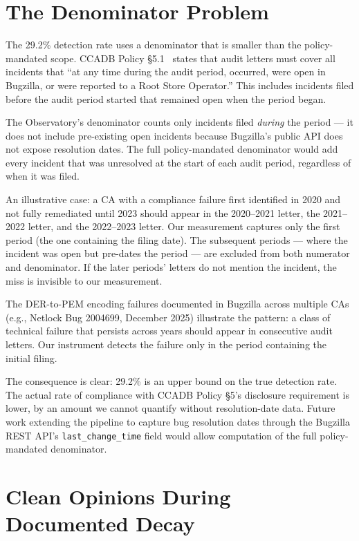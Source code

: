 \documentclass[10pt,twocolumn,letterpaper]{article}
\begin{document}
\section{The Denominator Problem}
\label{sec:denominator}

The 29.2\% detection rate uses a denominator that is smaller than the
policy-mandated scope. CCADB Policy \S5.1~\cite{ccadb-policy} states
that audit letters must cover all incidents that ``at any time during
the audit period, occurred, were open in Bugzilla, or were reported
to a Root Store Operator.'' This includes incidents filed before the
audit period started that remained open when the period began.

The Observatory's denominator counts only incidents filed \textit{during}
the period --- it does not include pre-existing open incidents because
Bugzilla's public API does not expose resolution dates. The full
policy-mandated denominator would add every incident that was
unresolved at the start of each audit period, regardless of when it
was filed.

An illustrative case: a CA with a compliance failure first identified
in 2020 and not fully remediated until 2023 should appear in the
2020--2021 letter, the 2021--2022 letter, and the 2022--2023 letter.
Our measurement captures only the first period (the one containing
the filing date). The subsequent periods --- where the incident was
open but pre-dates the period --- are excluded from both numerator
and denominator. If the later periods' letters do not mention the
incident, the miss is invisible to our measurement.

The DER-to-PEM encoding failures documented in Bugzilla across
multiple CAs (e.g., Netlock Bug 2004699, December 2025) illustrate
the pattern: a class of technical failure that persists across years
should appear in consecutive audit letters. Our instrument detects
the failure only in the period containing the initial filing.

The consequence is clear: 29.2\% is an upper bound on the true
detection rate. The actual rate of compliance with CCADB Policy \S5's
disclosure requirement is lower, by an amount we cannot quantify
without resolution-date data. Future work extending the pipeline to
capture bug resolution dates through the Bugzilla REST API's
\texttt{last\_change\_time} field would allow computation of the full
policy-mandated denominator.

\section{Clean Opinions During Documented Decay}
\label{sec:opinions}
\end{document}
